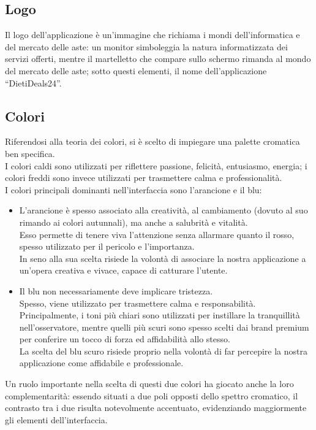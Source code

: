     \subsection{Logo}
    Il logo dell’applicazione è un’immagine che richiama i mondi dell’informatica e del mercato delle aste: un monitor simboleggia la natura informatizzata dei servizi offerti, mentre il martelletto che compare sullo schermo rimanda al mondo del mercato delle aste; sotto questi elementi, il nome dell’applicazione “DietiDeals24”.

    \subsection{Colori}
    Riferendosi alla teoria dei colori, si è scelto di impiegare una palette cromatica ben specifica. \\
    I colori caldi sono utilizzati per riflettere passione, felicità, entusiasmo, energia; i colori freddi sono invece utilizzati per trasmettere calma e professionalità. \\
    I colori principali dominanti nell’interfaccia sono l’arancione e il blu: 
    \begin{itemize}
        \item L’arancione è spesso associato alla creatività, al cambiamento (dovuto al suo rimando ai colori autunnali), ma anche a salubrità e vitalità. \\
        Esso permette di tenere viva l’attenzione senza allarmare quanto il rosso, spesso utilizzato per il pericolo e l’importanza. \\
        In seno alla sua scelta risiede la volontà di associare la nostra applicazione a un’opera creativa e vivace, capace di catturare l’utente.
        \item Il blu non necessariamente deve implicare tristezza. \\
        Spesso, viene utilizzato per trasmettere calma e responsabilità. \\
        Principalmente, i toni più chiari sono utilizzati per instillare la tranquillità nell’osservatore, mentre quelli più scuri sono spesso scelti dai brand premium per conferire un tocco di forza ed affidabilità allo stesso. \\
        La scelta del blu scuro risiede proprio nella volontà di far percepire la nostra applicazione come affidabile e professionale.
    \end{itemize}
    Un ruolo importante nella scelta di questi due colori ha giocato anche la loro complementarità: essendo situati a due poli opposti dello spettro cromatico, il contrasto tra i due risulta notevolmente accentuato, evidenziando maggiormente gli elementi dell’interfaccia. \\

